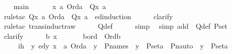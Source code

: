 \begin{isabellebody}
\ \ \isamarkupfalse%
\ main\ {\isacharcolon}{\kern0pt}\ \isanewline
\ \ \ \ {\isachardoublequoteopen}{\isasymAnd}x{\isachardot}{\kern0pt}\ {\isacharparenleft}{\kern0pt}{\isasymforall}a{\isachardot}{\kern0pt}\ Ord{\isacharparenleft}{\kern0pt}a{\isacharparenright}{\kern0pt}\ {\isasymlongrightarrow}\ Q{\isacharparenleft}{\kern0pt}x{\isacharcomma}{\kern0pt}\ a{\isacharparenright}{\kern0pt}{\isacharparenright}{\kern0pt}{\isachardoublequoteclose}\ \isanewline
\ \ \ \ \isamarkupfalse%
\ {\isacharparenleft}{\kern0pt}rule{\isacharunderscore}{\kern0pt}tac\ Q{\isacharequal}{\kern0pt}{\isachardoublequoteopen}{\isasymlambda}x{\isachardot}{\kern0pt}\ {\isacharparenleft}{\kern0pt}{\isasymforall}a{\isachardot}{\kern0pt}\ Ord{\isacharparenleft}{\kern0pt}a{\isacharparenright}{\kern0pt}\ {\isasymlongrightarrow}\ Q{\isacharparenleft}{\kern0pt}x{\isacharcomma}{\kern0pt}\ a{\isacharparenright}{\kern0pt}{\isacharparenright}{\kern0pt}{\isachardoublequoteclose}\ \ ed{\isacharunderscore}{\kern0pt}induction{\isacharparenright}{\kern0pt}\isanewline
\ \ \ \ \isamarkupfalse%
\ {\isacharparenleft}{\kern0pt}clarify{\isacharparenright}{\kern0pt}\ \isanewline
\ \ \ \ \isamarkupfalse%
\ {\isacharparenleft}{\kern0pt}rule{\isacharunderscore}{\kern0pt}tac\ trans{\isacharunderscore}{\kern0pt}induct{}{\isacharunderscore}{\kern0pt}raw{\isacharparenright}{\kern0pt}\isanewline
\ \ \ \ \isamarkupfalse%
\ Q{\isacharunderscore}{\kern0pt}def\isanewline
\ \ \ \ \isamarkupfalse%
\ simp\ \isamarkupfalse%
\ {\isacharparenleft}{\kern0pt}simp\ add\ {\isacharcolon}{\kern0pt}\ Q{\isacharunderscore}{\kern0pt}def\ P{\isacharunderscore}{\kern0pt}set{\isacharunderscore}{\kern0pt}{}{\isacharparenright}{\kern0pt}\ \isanewline
\ \ \isamarkupfalse%
\ {\isacharparenleft}{\kern0pt}clarify{\isacharparenright}{\kern0pt}\isanewline
\ \ \ \ \isamarkupfalse%
\ b\ x\ \isanewline
\ \ \ \ \isamarkupfalse%
\ bord\ {\isacharcolon}{\kern0pt}\ {\isachardoublequoteopen}Ord{\isacharparenleft}{\kern0pt}b{\isacharparenright}{\kern0pt}{\isachardoublequoteclose}\ \isanewline
\ \ \ \ \ ih\ {\isacharcolon}{\kern0pt}\ {\isachardoublequoteopen}{\isasymAnd}y{\isachardot}{\kern0pt}\ ed{\isacharparenleft}{\kern0pt}y{\isacharcomma}{\kern0pt}\ x{\isacharparenright}{\kern0pt}\ {\isasymLongrightarrow}\ {\isasymforall}a{\isachardot}{\kern0pt}\ Ord{\isacharparenleft}{\kern0pt}a{\isacharparenright}{\kern0pt}\ {\isasymlongrightarrow}\ {\isacharparenleft}{\kern0pt}y\ {\isasymin}\ P{\isacharunderscore}{\kern0pt}names\ {\isasymlongrightarrow}\ y\ {\isasymin}\ P{\isacharunderscore}{\kern0pt}set{\isacharparenleft}{\kern0pt}a{\isacharparenright}{\kern0pt}\ {\isasymlongleftrightarrow}\ Pn{\isacharunderscore}{\kern0pt}auto{\isacharparenleft}{\kern0pt}{\isasympi}{\isacharparenright}{\kern0pt}\ {\isacharbackquote}{\kern0pt}\ y\ {\isasymin}\ P{\isacharunderscore}{\kern0pt}set{\isacharparenleft}{\kern0pt}a{\isacharparenright}{\kern0pt}{\isacharparenright}{\kern0pt}{\isachardoublequoteclose}\ \isanewline

\end{isabellebody}
